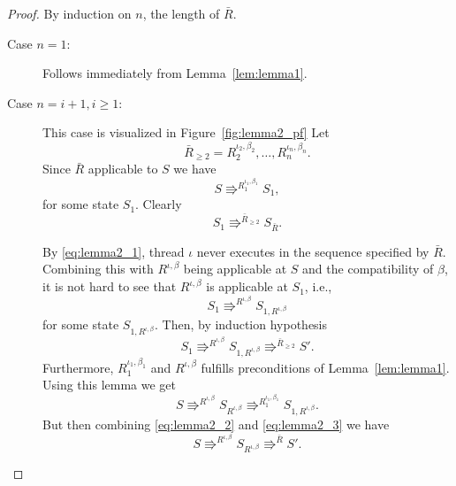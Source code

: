 \begin{proof}
  By induction on $n$, the length of $\bar{R}$.
  \begin{description}
    \item[Case $n = 1$:] Follows immediately from Lemma~\ref{lem:lemma1}.
    \item[Case $n = i+1, i \geq 1$:] This case is visualized in
      Figure~\ref{fig:lemma2_pf} Let
      \begin{equation*}
        \bar{R}_{\geq 2} = R_2^{\iota_2, \beta_2}, \dots, R_n^{\iota_n, \beta_n}.
      \end{equation*}
      Since $\bar{R}$ applicable to $S$ we have 
      \begin{equation}
        S \Rrightarrow^{R_1^{\iota_1, \beta_1}} S_1,
      \end{equation}
      for some state $S_1$. Clearly
      \begin{equation}
        S_1 \Rrightarrow^{\bar{R}_{\geq 2}} S_{\bar{R}}.
      \end{equation}
      
      By \eqref{eq:lemma2_1}, thread $\iota$ never executes in the sequence
      specified by $\bar{R}$. Combining this with $R^{\iota, \beta}$ being
      applicable at $S$ and the compatibility of $\beta$, it is not hard to see
      that $R^{\iota, \beta}$ is applicable at $S_1$, i.e.,
      \begin{equation}
        S_1 \Rrightarrow^{R^{\iota, \beta}} S_{1,R^{\iota, \beta}}
      \end{equation}
      for some state $S_{1,R^{\iota, \beta}}$. Then, by induction hypothesis
      \begin{equation} \label{eq:lemma2_2}
        S_1 \Rrightarrow^{R^{\iota, \beta}} S_{1,R^{\iota, \beta}} \Rrightarrow^{\bar{R}_{\geq 2}} S'.
      \end{equation}
      Furthermore, $R_1^{\iota_1, \beta_1}$ and $R^{\iota, \beta}$ fulfills
      preconditions of Lemma~\ref{lem:lemma1}. Using this lemma we get
      \begin{equation} \label{eq:lemma2_3}
        S \Rrightarrow^{R^{\iota, \beta}} S_{R^{\iota, \beta}}
        \Rrightarrow^{R_1^{\iota_1, \beta_1}} S_{1, R^{\iota, \beta}}.
      \end{equation}
      But then combining \eqref{eq:lemma2_2} and \eqref{eq:lemma2_3} we have
      \begin{equation}
        S \Rrightarrow^{R^{\iota, \beta}} S_{R^{\iota, \beta}} \Rrightarrow^{\bar{R}} S'.
      \end{equation}
  \end{description}
\end{proof}

